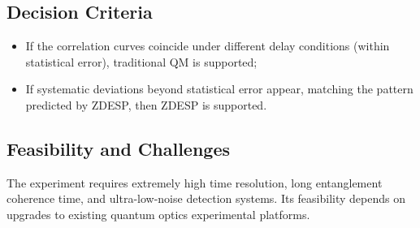 \documentclass[12pt,a4paper]{article}
\begin{document}
	\subsection{Decision Criteria}
	\begin{itemize}
		\item If the correlation curves coincide under different delay conditions (within statistical error), traditional QM is supported;
		\item If systematic deviations beyond statistical error appear, matching the pattern predicted by ZDESP, then ZDESP is supported.
	\end{itemize}
	
	\subsection{Feasibility and Challenges}
	The experiment requires extremely high time resolution, long entanglement coherence time, and ultra-low-noise detection systems. Its feasibility depends on upgrades to existing quantum optics experimental platforms.
	
\end{document}
